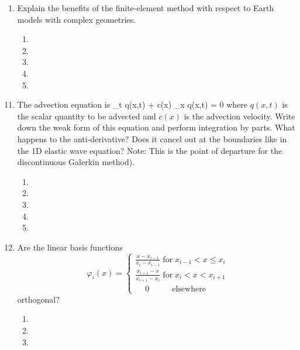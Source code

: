\begin{enumerate}
\begin{enumerate}
\item[] 
\item[]
\item[] 
\end{enumerate}
\item
Explain the benefits of the finite-element method with respect to Earth models with complex geometries. 
\begin{enumerate}
\item[]
\item[]
\item[] 
\item[]
\item[] 
\end{enumerate}
\end{enumerate}

\begin{enumerate}
\setcounter{enumi}{10}
\item
The  advection equation is  
\be
 \partial_t q(x,t) + c(x) \partial_x q(x,t) = 0
  \nonumber
\ee
where $q(x,t)$ is the scalar quantity to be advected and $c(x)$ is the advection velocity. Write down the weak form of this equation and perform integration by parts. 
What happens to the anti-derivative? Does it cancel out at the boundaries like in the 1D elastic wave equation? Note: This is the point of departure for the discontinuous Galerkin method). 
\begin{enumerate}
\item[]
\item[]
\item[] 
\item[]
\item[] 
\end{enumerate} 
\item  
Are the linear basis functions 
\begin{equation}
	\varphi_i (x) = 
	\begin{cases} \frac{x - x_{i-1}}{x_i - x_{i-1}} \;  \text{for} \;  x_{i-1} < x \leq x_i \\ 
	\frac{x_{i+1} - x}{x_{i+1} - x_i} \; \text{for} \; x_i < x < x_{i+1} \\
	\phantom{-} 0 \; \; \; \; \; \; \; \; \; \; \text{elsewhere}
	\end{cases}
	\nonumber
\end{equation}
orthogonal?
\begin{enumerate}
\item[]
\item[]
\item[] 

\end{enumerate}
\end{enumerate}
